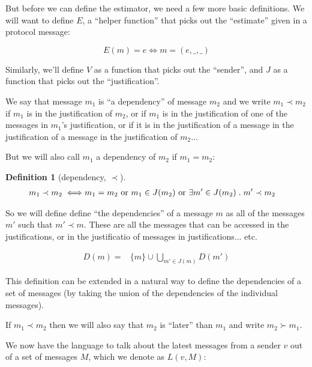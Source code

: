 \documentclass{article}
\theoremstyle{definition}
\newtheorem{defn}{Definition}[section]
\begin{document}
But before we can define the estimator, we need a few more basic definitions. We will want to define $E$, a ``helper function'' that picks out the ``estimate'' given in a protocol message:

$$
E(m) = e \iff m = (e, \_, \_)
$$

Similarly, we'll define $V$ as a function that picks out the ``sender'', and $J$ as a function that picks out the ``justification''.  

We say that message $m_1$ is ``a dependency'' of message $m_2$ and we write $m_1 \prec m_2$ if $m_1$ is in the justification of $m_2$, or if $m_1$ is in the justification of one of the messages in $m_1$'s justification, or if it is in the justification of a message in the justification of a message in the justification of $m_2$...

But we will also call $m_1$ a dependency of $m_2$ if $m_1 = m_2$:

\begin{defn}[dependency, $\prec$]
\begin{equation*}
\begin{split}
m_1 \prec m_2 \iff & m_1 = m_2 \text{ or } m_1 \in J(m_2) \text{ or } \exists m' \in J(m_2) \hspace{1mm} . \hspace{1mm} m' \prec m_2
\end{split}
\end{equation*}
\end{defn}

So we will define define ``the dependencies'' of a message $m$ as all of the messages $m'$ such that $m' \prec m$. These are all the messages that can be accessed in the justifications, or in the justificatio of messages in justifications... etc.

\begin{equation*}
\begin{split}
D(m) = &\{m\}\cup \bigcup_{m' \in J(m)} D(m') 
\end{split}
\end{equation*}

This definition can be extended in a natural way to define the dependencies of a set of messages (by taking the union of the dependencies of the individual messages).

If $m_1 \prec m_2$ then we will also say that $m_2$ is ``later'' than $m_1$ and write $m_2 \succ m_1$.

We now have the language to talk about the latest messages from a sender $v$ out of a set of messages $M$, which we denote as $L(v, M)$:
\end{document}
